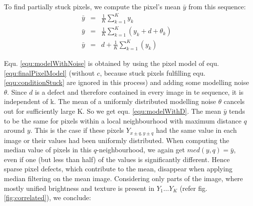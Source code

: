 \documentclass[10pt,twocolumn,letterpaper]{article}
\begin{document}
To find partially stuck pixels, we compute the pixel's mean $\bar{y}$ from this sequence:
\begin{eqnarray}
\bar{y} & = & \frac{1}{K}\sum\limits_{k=1}^{K}y_k \\
\bar{y} & = & \frac{1}{K}\sum\limits_{k=1}^{K}(y_k+d+\theta_k) \label{equ:modelWithNoise} \\
\bar{y} & = & d+\frac{1}{K}\sum\limits_{k=1}^{K}(y_k) \label{equ:modelWithD}
\end{eqnarray}

Equ. \ref{equ:modelWithNoise} is obtained by using the pixel model of equ. \ref{equ:finalPixelModel} (without $c$, because stuck pixels fulfilling equ. \ref{equ:conditionStuck} are ignored in this process) and adding some modelling noise $\theta$. Since $d$ is a defect and therefore contained in every image in te sequence, it is independent of k. The mean of a uniformly distributed modelling noise $\theta$ cancels out for sufficiently large K. So we get equ. \ref{equ:modelWithD}.
The mean $\bar{y}$ tends to be the same for pixels within a local neighbourhood with maximum distance $q$ around $y$. This is the case if these pixels $Y_{{x \pm q, y \pm q}}$ had the same value in each image or their values had been uniformly distributed. When computing the median value of pixels in this $q$-neighbourhood, we again get $med(y,q) = \bar{y}$, even if one (but less than half) of the values is significantly different. Hence sparse pixel defects, which contribute to the mean, disappear when applying median filtering on the mean image. Considering only parts of the image, where mostly unified brightness and texture is present in $Y_1 \dots Y_K$ (refer fig. \ref{fig:correlated}), we conclude:
\end{document}

